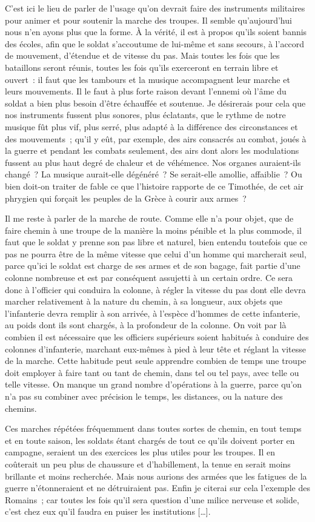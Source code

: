 \documentclass[french,twoside]{book} %
\begin{document}
C’est ici le lieu de parler de l’usage qu’on devrait faire des instruments militaires pour animer et pour soutenir la marche des troupes. Il semble qu’aujourd’hui nous n’en ayons plus que la forme. À la vérité, il est à propos qu’ils soient bannis des écoles, afin que le soldat s’accoutume de lui-même et sans secours, à l’accord de mouvement, d’étendue et de vitesse du pas. Mais toutes les fois que les bataillons seront réunis, toutes les fois qu’ils exerceront en terrain libre et ouvert : il faut que les tambours et la musique accompagnent leur marche et leurs mouvements. Il le faut à plus forte raison devant l’ennemi où l’âme du soldat a bien plus besoin d’être échauffée et soutenue. Je désirerais pour cela que nos instruments fussent plus sonores, plus éclatants, que le rythme de notre musique fût plus vif, plus serré, plus adapté à la différence des circonstances et des mouvements ; qu’il y eût, par exemple, des airs consacrés au combat, joués à la guerre et pendant les combats seulement, des airs dont alors les modulations fussent au plus haut degré de chaleur et de véhémence. Nos organes auraient-ils changé ? La musique aurait-elle dégénéré ? Se serait-elle amollie, affaiblie ? Ou bien doit-on traiter de fable ce que l’histoire rapporte de ce Timothée, de cet air phrygien qui forçait les peuples de la Grèce à courir aux armes ?\par
Il me reste à parler de la marche de route. Comme elle n’a pour objet, que de faire chemin à une troupe de la manière la moins pénible et la plus commode, il faut que le soldat y prenne son pas libre et naturel, bien entendu toutefois que ce pas ne pourra être de la même vitesse que celui d’un homme qui marcherait seul, parce qu’ici le soldat est charge de ses armes et de son bagage, fait partie d’une colonne nombreuse et est par conséquent assujetti à un certain ordre. Ce sera donc à l’officier qui conduira la colonne, à régler la vitesse du pas dont elle devra marcher relativement à la nature du chemin, à sa longueur, aux objets que l’infanterie devra remplir à son arrivée, à l’espèce d’hommes de cette infanterie, au poids dont ils sont chargés, à la profondeur de la colonne. On voit par là combien il est nécessaire que les officiers supérieurs soient habitués à conduire des colonnes d’infanterie, marchant eux-mêmes à pied à leur tête et réglant la vitesse de la marche. Cette habitude peut seule apprendre combien de temps une troupe doit employer à faire tant ou tant de chemin, dans tel ou tel pays, avec telle ou telle vitesse. On manque un grand nombre d’opérations à la guerre, parce qu’on n’a pas su combiner avec précision le temps, les distances, ou la nature des chemins.\par
Ces marches répétées fréquemment dans toutes sortes de chemin, en tout temps et en toute saison, les soldats étant chargés de tout ce qu’ils doivent porter en campagne, seraient un des exercices les plus utiles pour les troupes. Il en coûterait un peu plus de chaussure et d’habillement, la tenue en serait moins brillante et moins recherchée. Mais nous aurions des armées que les fatigues de la guerre n’étonneraient et ne détruiraient pas. Enfin je citerai sur cela l’exemple des Romains ; car toutes les fois qu’il sera question d’une milice nerveuse et solide, c’est chez eux qu’il faudra en puiser les institutions […].
\end{document}
